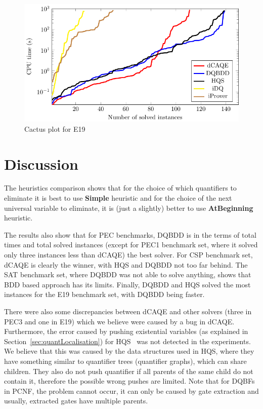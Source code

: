 \documentclass[
  digital, %
  color,
  twoside, %
  table,   %
  nolof,     %
  nolot,     %
]{fithesis3}
\theoremstyle{definition}
\theoremstyle{remark}
\newcommand{\QEsimple}{\textbf{Simple}}
\newcommand{\QUatbeginning}{\textbf{At\-Be\-gin\-ning}}
\begin{document}
\begin{figure}
  \centering
    \centering
    \includegraphics[width=\textwidth]{figures/E19logcactusplot.pdf}
  \caption{Cactus plot for E19}
  \label{fig:cactusE19}
\end{figure}

\section{Discussion}
The heuristics comparison shows that for the choice of which quantifiers to eliminate it is best to use \QEsimple{} heuristic and for the choice of the next universal variable to eliminate, it is (just a slightly) better to use \QUatbeginning{} heuristic. 

The results also show that for PEC benchmarks, DQBDD is in the terms of total times and total solved instances (except for PEC1 benchmark set, where it solved only three instances less than dCAQE) the best solver. For CSP benchmark set, dCAQE is clearly the winner, with HQS and DQBDD not too far behind. The SAT benchmark set, where DQBDD was not able to solve anything, shows that BDD based approach has its limits. Finally, DQBDD and HQS solved the most instances for the E19 benchmark set, with DQBDD being faster.

There were also some discrepancies between dCAQE and other solvers (three in PEC3 and one in E19) which we believe were caused by a bug in dCAQE. Furthermore, the error caused by pushing existential variables (as explained in Section~\ref{sec:quantLocalisation}) for HQS~\cite{HQSquantifierLocalisation} was not detected in the experiments. We believe that this was caused by the data structures used in HQS, where they have something similar to quantifier trees (quantifier graphs), which can share children. They also do not push quantifier if all parents of the same child do not contain it, therefore the possible wrong pushes are limited. Note that for DQBFs in PCNF, the problem cannot occur, it can only be caused by gate extraction and usually, extracted gates have multiple parents.
\end{document}
